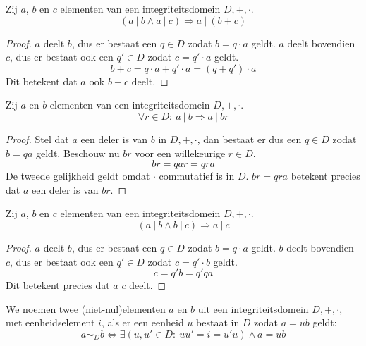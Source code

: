 \documentclass[main.tex]{subfiles}
\begin{document}
\begin{st}
  Zij $a$, $b$ en $c$ elementen van een integriteitsdomein $D,+,\cdot$.
  \[ (a\ |\ b \wedge a\ |\ c) \Rightarrow a\ |\ (b+c) \]

  \begin{proof}
    $a$ deelt $b$, dus er bestaat een $q \in D$ zodat $b=q\cdot a$ geldt.
    $a$ deelt bovendien $c$, dus er bestaat ook een $q'\in D$ zodat $c = q'\cdot a$ geldt. 
    \[
      b + c = q\cdot a + q'\cdot a = (q+q')\cdot a 
    \]
    Dit betekent dat $a$ ook $b+c$ deelt.
  \end{proof}
\end{st}

\begin{st}
  Zij $a$ en $b$ elementen van een integriteitsdomein $D,+,\cdot$.
  \[ \forall r \in D:\ a\ |\ b \Rightarrow a\ |\ br  \]

  \begin{proof}
    Stel dat $a$ een deler is van $b$ in $D,+,\cdot$, dan bestaat er dus een $q\in D$ zodat $b = qa$ geldt.
    Beschouw nu $br$ voor een willekeurige $r\in D$.
    \[ br = qar = qra \]
    De tweede gelijkheid geldt omdat $\cdot$ commutatief is in $D$.
    $br =qra$ betekent precies dat $a$ een deler is van $br$.
  \end{proof}
\end{st}

\begin{st}
  \label{st:deler-transitief}
  Zij $a$, $b$ en $c$ elementen van een integriteitsdomein $D,+,\cdot$.
  \[ (a\ |\ b \wedge b\ |\ c) \Rightarrow a\ |\ c \]

  \begin{proof}
    $a$ deelt $b$, dus er bestaat een $q \in D$ zodat $b=q\cdot a$ geldt.
    $b$ deelt bovendien $c$, dus er bestaat ook een $q'\in D$ zodat $c = q'\cdot b$ geldt. 
    \[ c = q'b = q'qa \]
    Dit betekent precies dat $a$ $c$ deelt.
  \end{proof}
\end{st}

\begin{de}
  We noemen twee (niet-nul)elementen $a$ en $b$ uit een integriteitsdomein $D,+,\cdot$, met eenheidselement $i$,  als er een eenheid $u$ bestaat in $D$ zodat $a=ub$ geldt:
  \[ a \sim_{D} b \Leftrightarrow \exists (u,u'\in D:\ uu'= i = u'u) \wedge a = ub \]
\end{de}
\end{document}
